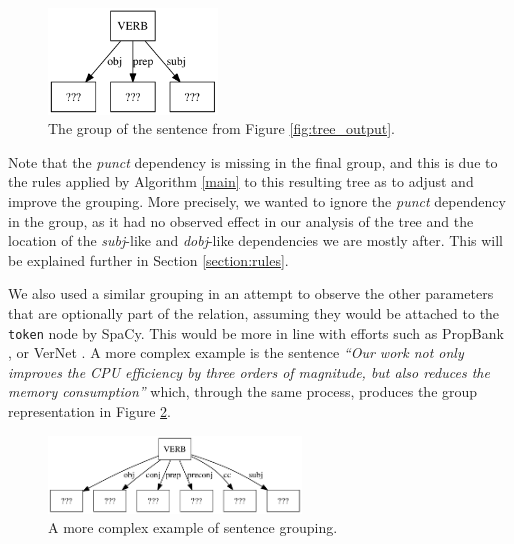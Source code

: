 \documentclass[11pt,a4paper,openright]{memoir}
\begin{document}
\begin{figure}[!htbp]
  \centering
    \includegraphics[width=0.4\textwidth]{./images/command-simplified-group-uses-3}
  \caption[The group of the sentence.]{The group of the sentence from Figure \ref{fig:tree_output}.}
  \label{fig:group_output_2}
\end{figure}

Note that the \emph{punct} dependency is missing in the final group, and this is due to the rules applied by Algorithm \ref{main} to this resulting tree as to adjust and improve the grouping. More precisely, we wanted to ignore the \emph{punct} dependency in the group, as it had no observed effect in our analysis of the tree and the location of the \emph{subj}-like and \emph{dobj}-like dependencies we are mostly after. This will be explained further in Section \ref{section:rules}. 

We also used a similar grouping in an attempt to observe the other parameters that are optionally part of the relation, assuming they would be attached to the \texttt{token} node by SpaCy. This would be more in line with efforts such as PropBank \cite{Palmer:2005:PBA:1122624.1122628}, or VerNet \cite{Schuler:2005:VBC:1104493}. A more complex example is the sentence \emph{\enquote{Our work not only improves the CPU efficiency by three orders of magnitude, but also reduces the memory consumption}} which, through the same process, produces the group representation in Figure \ref{fig:group_output_3}.

\begin{figure}[!htbp]
  \centering
    \includegraphics[width=0.6\textwidth]{./images/command-simplified-group-improves-29}
  \caption[A more complex example of sentence grouping.]{A more complex example of sentence grouping.}
  \label{fig:group_output_3}
\end{figure}
\end{document}
